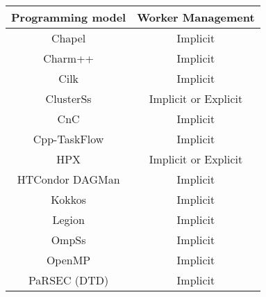 \begin{tabular}{cc}
\hline
Programming model & Worker Management \\
\hline
Chapel & Implicit\\
Charm++ & Implicit\\
Cilk & Implicit\\
ClusterSs & Implicit or Explicit\\
CnC & Implicit\\
Cpp-TaskFlow & Implicit\\
HPX & Implicit or Explicit\\
HTCondor DAGMan & Implicit\\
Kokkos & Implicit\\
Legion & Implicit\\
OmpSs & Implicit\\
OpenMP & Implicit\\
PaRSEC (DTD) & Implicit\\
\hline
\end{tabular}
